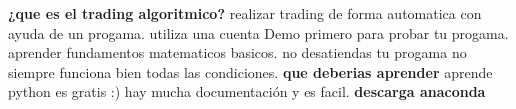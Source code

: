 \documentclass{article}
\begin{document}


\textbf{¿que es el trading algoritmico?}
realizar trading de forma automatica con ayuda de un progama.
utiliza una cuenta Demo primero para probar tu progama.
aprender fundamentos matematicos basicos.
no desatiendas tu progama no siempre funciona bien todas las condiciones.
\textbf{que deberias aprender}
aprende python es gratis :) 
hay mucha documentación y es facil. 
\textbf{descarga anaconda}
\end{document}
